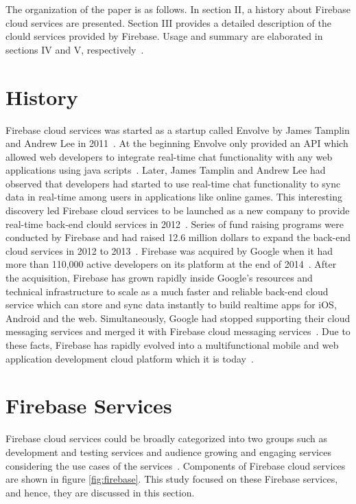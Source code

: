 The organization of the paper is as follows. In section II, a history about 
Firebase cloud services are presented. Section III provides a detailed 
description of the clould services provided by Firebase. Usage and summary are 
elaborated in sections IV and V, respectively~\cite{editor00}.

\section{History}

Firebase cloud services was started as a startup called Envolve by James 
Tamplin and Andrew Lee in 2011~\cite{hid-sp18-409-www-firebase-wikipedia}. At 
the beginning Envolve only provided an API which allowed web developers to 
integrate real-time chat functionality with any web applications using java 
scripts~\cite{hid-sp18-409-www-firebase}. Later, James Tamplin and Andrew Lee 
had observed that developers had started to use real-time chat functionality to 
sync data in real-time among users in applications like online games. This 
interesting discovery led Firebase cloud services to be launched as a new 
company to provide real-time back-end clould services in 
2012~\cite{hid-sp18-409-www-firebase-wikipedia}. Series of fund raising 
programs were conducted by Firebase and had raised 12.6 million dollars to 
expand the back-end cloud services in 2012 to 
2013~\cite{hid-sp18-409-www-firebase}. Firebase was acquired by Google when it 
had more than 110,000 active developers on its platform  at the end of 
2014~\cite{hid-sp18-409-www-firebase-acquired}. After the acquisition, Firebase 
has grown rapidly inside Google's resources and technical infrastructure to 
scale as a much faster and reliable back-end cloud service which can store and 
sync data instantly to build realtime apps for iOS, Android and the web. 
Simultaneously, Google had stopped supporting their cloud messaging services 
and merged it with Firebase cloud messaging 
services~\cite{hid-sp18-409-www-firebase-merged}. Due to these facts, Firebase 
has rapidly evolved into a multifunctional mobile and web application 
development cloud platform which it is 
today~\cite{hid-sp18-409-www-firebase-official}.

\section{Firebase Services}

Firebase cloud services could be broadly categorized into two groups such as 
development and testing services and audience growing and engaging services 
considering the use cases of the 
services~\cite{hid-sp18-409-www-firebase-products}. Components of Firebase 
cloud services are shown in figure \ref{fig:firebase}. This study focused on 
these Firebase services, and hence, they are discussed in this section. 

